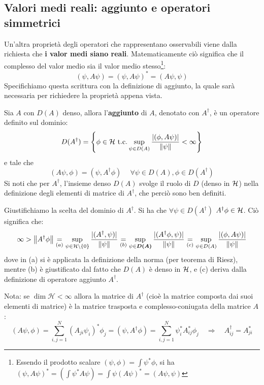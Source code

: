 \documentclass[FisicaTeorica.tex]{subfiles}
\begin{document}
\subsection{Valori medi reali: aggiunto e operatori simmetrici}
Un'altra proprietà degli operatori che rappresentano osservabili viene dalla richiesta che \textbf{i valor medi siano reali}. Matematicamente ciò significa che il complesso del valor medio sia il valor medio stesso\footnote{Essendo il prodotto scalare $(\psi, \phi) = \int \psi^* \phi$, si ha $(\psi, A\psi)^* = \left (\int \psi^* A\psi\right ) = \int \psi (A\psi)^* = (A\psi, \psi)$}:
	\[
	\left(\psi,A\psi\right)=\left(\psi,A\psi\right)^*=\left(A\psi,\psi\right)
	\]
	Specifichiamo questa scrittura con la definizione di aggiunto, la quale sarà necessaria per richiedere la proprietà appena vista.
	\begin{dfn}
	Sia $A$ con $D(A)$ denso, allora l'\textbf{aggiunto} di $A$, denotato con $A^\dag$, è un operatore definito sul dominio:
	\[
	D(A^\dag) = \left \{\phi \in \mathcal{H} \text{ t.c.} \sup_{\psi \in D(A)} \frac{|(\phi, A\psi)|}{\left\lVert\psi\right\rVert}< \infty \right \}
	\]
	e tale che
	\[
	\left(A\psi,\phi\right)=\left(\psi,A^\dag\phi\right)\> \quad \forall \psi \in D\left(A\right), \phi \in D\left(A^\dag \right)
	\]
	Si noti che per $A^\dag$, l'insieme denso $D(A)$ svolge il ruolo di $D$ (denso in $\mathcal{H}$) nella definizione degli elementi di matrice di $A^\dag$, che perciò sono ben definiti.
	\end{dfn}
	\begin{appr}
	Giustifichiamo la scelta del dominio di $A^\dag$. Si ha che $\forall \psi \in D(A^\dag)$ $A^\dag \phi \in \mathcal{H}$. Ciò significa che:
	\[
	\infty > \left\lVert A^\dag \phi\right\rVert \underset{(a)}{=} \sup_{\psi \in \mathcal{H}\setminus \{0\}} \frac{|(A^\dag,\psi)|}{\left\lVert\psi\right\rVert} \underset{(b)}{=} \sup_{\psi \in \bm{D(A)}} \frac{|(A^\dag\phi, \psi)|}{\left\lVert\psi\right\rVert} \underset{(c)}{=} \sup_{\psi \in D(A)} \frac{|(\phi,A\psi)|}{\left\lVert\psi\right\rVert}
	\]
	dove in (a) si è applicata la definizione della norma (per teorema di Riesz), mentre (b) è giustificato dal fatto che $D(A)$ è denso in $\mathcal{H}$, e (c) deriva dalla definizione di operatore aggiunto $A^\dag$.
	\end{appr}
	Nota: se $\dim{\mathcal{H}<\infty}$ allora la matrice di $A^\dag$ (cioè la matrice composta dai suoi elementi di matrice) è la matrice trasposta e complesso-coniugata della matrice $A$:
	\[
	\left(A\psi,\phi\right)=\sum_{i,j=1}^{N}{\left(A_{ji}\psi_i\right)^*\phi_j=\left(\psi,A^\dag\phi\right)=\sum_{i,j=1}^{N}{\psi_i^* A_{ij}^*\phi_j} \quad \Rightarrow \quad A_{ij}^\dag=A_{ji}^*}
	\]
\end{document}
